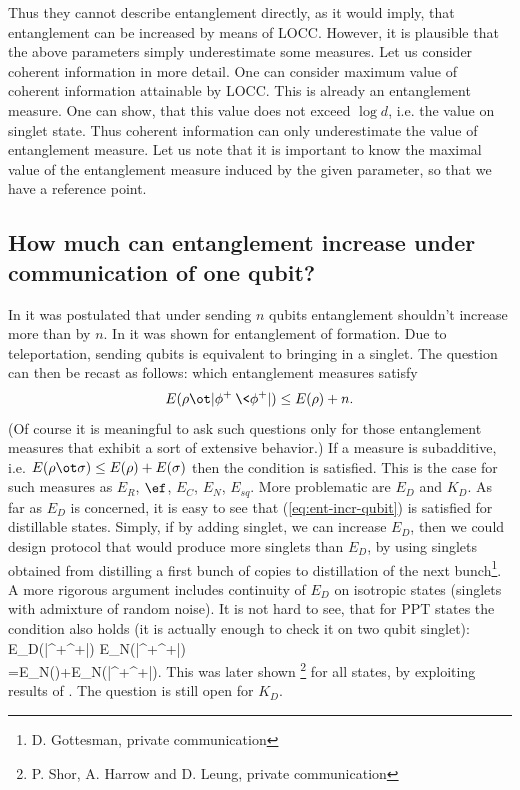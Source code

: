 \documentclass[twocolumn,aps,rmp]{revtex4}
\begin{document}
Thus they cannot describe entanglement directly, as it would imply,
that entanglement can be increased by means of LOCC. However, it is
plausible that the above parameters simply underestimate some
measures.  Let us consider coherent information in more detail.  One
can consider maximum value of coherent information attainable by
LOCC. This is already an entanglement measure.  One can show, that
this value does not exceed $\log d$, i.e. the value on singlet state.
Thus coherent information can only underestimate the value of
entanglement measure. Let us note that it is important to know the
maximal value of the entanglement measure induced by the given
parameter, so that we have a reference point.

\subsection{How much can entanglement increase under communication of one qubit?}

In \cite{LoPopescu} it was postulated that under sending $n$ qubits
entanglement shouldn't increase more than by $n$. In
\cite{ChenYang2000-ent-qubit} it was shown for entanglement of
formation.  Due to teleportation, sending qubits is equivalent to
bringing in a singlet. The question can then be recast as follows:
which entanglement measures satisfy
\begin{equation}
  E(\rho\ot |\phi^+\>\<\phi^+|) \leq E(\rho) + n.
  \label{eq:ent-incr-qubit}
\end{equation}
(Of course it is meaningful to ask such questions only for those
entanglement measures that exhibit a sort of extensive behavior.) If a
measure is subadditive, i.e. $E(\rho\ot \sigma) \leq
E(\rho)+E(\sigma)$ then the condition is satisfied. This is the case
for such measures as $E_R$, $\ef$, $E_C$, $E_N$, $E_{sq}$. More
problematic are $E_D$ and $K_D$. As far as $E_D$ is concerned, it is
easy to see that (\ref{eq:ent-incr-qubit}) is satisfied for
distillable states.  Simply, if by adding singlet, we can increase
$E_D$, then we could design protocol that would produce more singlets
than $E_D$, by using singlets obtained from distilling a first bunch
of copies to distillation of the next bunch\footnote{D. Gottesman,
private communication}. A more rigorous argument
includes continuity of $E_D$ on isotropic states (singlets with
admixture of random noise).  It is not hard to see, that for PPT
states the condition also holds (it is actually enough to check it on
two qubit singlet):
\ben
E_D(\rho\ot |\phi^+\>\<\phi^+|)\leq
E_N(\rho\ot |\phi^+\>\<\phi^+|)\nonumber \\
=E_N(\rho)+E_N(|\phi^+\>\<\phi^+|).
\een
This was later shown \footnote{P. Shor, A. Harrow and D. Leung, private communication} for all states, by
exploiting results of \cite{DiVincenzoMSST1999-UPB-huge}. The question
is still open for $K_D$.
\end{document}
